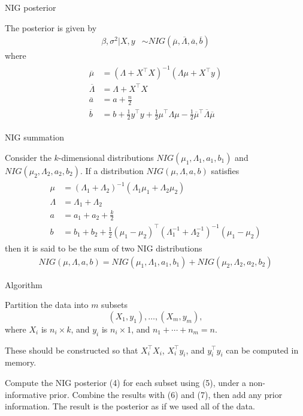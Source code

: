 \documentclass[mathserif, 11pt, t]{beamer}
\begin{document}
\begin{frame}{NIG posterior}

The posterior is given by
\begin{align}
\beta,\sigma^2 |X, y &\sim NIG(\overline{\mu}, \overline{\Lambda}, \overline{a}, \overline{b})
\end{align}
where
\begin{align}
\begin{split}
\overline{\mu} &= (\Lambda + X^\top X)^{-1}(\Lambda \mu + X^\top y) \\
\overline{\Lambda} &= \Lambda + X^\top X \\
\overline{a} &= a + \frac{n}{2} \\
\overline{b} &= b + \frac{1}{2}y^\top y + \frac{1}{2}\mu^\top \Lambda\mu -\frac{1}{2}\overline{\mu}^\top\overline{\Lambda}\overline{\mu} 
\end{split}
\end{align}

\end{frame}


\begin{frame}{NIG summation}

Consider the $k$-dimensional distributions $NIG(\mu_1, \Lambda_1, a_1, b_1)$ and $NIG(\mu_2, \Lambda_2, a_2, b_2)$. If a distribution $NIG(\mu, \Lambda, a, b)$ satisfies
\begin{align}
\begin{split}
\mu &=(\Lambda_1+\Lambda_2)^{-1}(\Lambda_1\mu_1 + \Lambda_2\mu_2) \\
\Lambda &=\Lambda_1+\Lambda_2 \\
a &=a_1+a_2+\frac{k}{2} \\
b &=b_1+b_2+\frac{1}{2}(\mu_1-\mu_2)^\top(\Lambda_1^{-1}+\Lambda_2^{-1})^{-1}(\mu_1-\mu_2)
\end{split}
\end{align}
then it is said to be the sum of two NIG distributions
\begin{align}
NIG(\mu, \Lambda, a, b) = NIG(\mu_1, \Lambda_1, a_1, b_1) + NIG(\mu_2, \Lambda_2, a_2, b_2)
\end{align}

\end{frame}


\begin{frame}{Algorithm}

Partition the data into $m$ subsets
\[ (X_1, y_1), \ldots, (X_m, y_m), \]
where $X_i$ is $n_i \times k$, and $y_i$ is $n_i\times 1$, and $n_1+\cdots+n_m=n$.
\bigskip

These should be constructed so that $X_i^\top X_i$, $X_i^\top y_i$, and $y_i^\top y_i$ can be computed in memory.        
\bigskip

Compute the NIG posterior (4) for each subset using (5), under a non-informative prior. Combine the results with (6) and (7), then add any prior information. The result is the posterior as if we used all of the data.

\end{frame}
\end{document}
